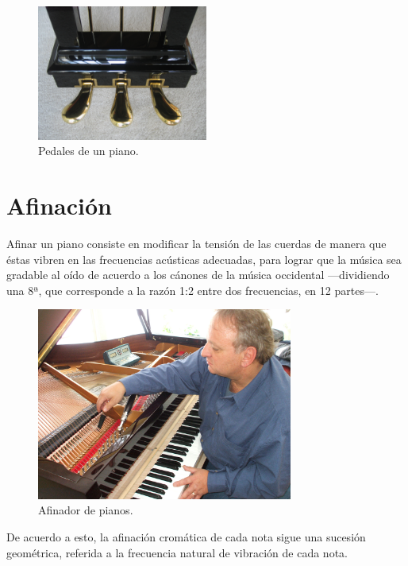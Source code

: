 \documentclass[10pt,a4paper]{article}
\begin{document}
	\begin{figure}[!ht]
		\centering
		\includegraphics[width=0.5\textwidth]{images/pedals}
		\caption[Pedales de un piano]{\label{fig:pedals} Pedales de un piano.}
	\end{figure}
	
	
	\clearpage
	\section{Afinación}
	
	Afinar un piano consiste en modificar la tensión de las cuerdas de manera 
	que éstas vibren en las frecuencias acústicas adecuadas, para lograr que la 
	música sea gradable al oído de acuerdo a los cánones de la música 
	occidental ---dividiendo una 8ª, que corresponde a la razón 1:2 entre dos 
	frecuencias, en 12 partes---.
	
	\begin{figure}[!ht]
		\centering
		\includegraphics[width=0.75\textwidth]{images/tuner}
		\caption[Afinador de pianos]{\label{fig:tuner} Afinador de pianos.}
	\end{figure}
	
	De acuerdo a esto, la afinación cromática de cada nota sigue una sucesión 
	geométrica, referida a la frecuencia natural de vibración de cada nota.
	
\end{document}

